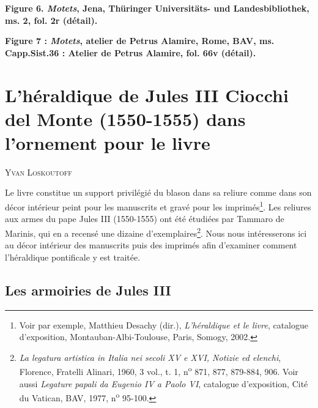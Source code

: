 \documentclass[12pt,twoside,openany]{book}
\newcommand{\PurhContributors}[1]{%
  \par\vspace{0.5\baselineskip}%
  {\normalsize\scshape #1\par}%
  \vspace{0.6\baselineskip}%
}
\begin{document}
\begin{center}
\par\small \textbf{Figure 6. \textit{Motets}, Jena, Thüringer Universitäts- und Landesbibliothek, ms. 2, fol. 2r (détail).}
\end{center}

\begin{center}
\par\small \textbf{Figure 7 : \textit{Motets}, atelier de Petrus Alamire, Rome, BAV, ms. Capp.Sist.36 : Atelier de Petrus Alamire, fol. 66v (détail).}
\end{center}

\chapter{L’héraldique de Jules III Ciocchi del Monte (1550-1555) dans l’ornement pour le livre}

\PurhContributors{Yvan Loskoutoff}

Le livre constitue un support privilégié du blason dans sa reliure comme dans son décor intérieur peint pour les manuscrits et gravé pour les imprimés\footnote{Voir par exemple, Matthieu Desachy (dir.), \textit{L’héraldique et le livre}, catalogue d’exposition, Montauban-Albi-Toulouse, Paris, Somogy, 2002.}. Les reliures aux armes du pape Jules III (1550-1555) ont été étudiées par Tammaro de Marinis, qui en a recensé une dizaine d’exemplaires\footnote{\textit{La legatura artistica in Italia nei secoli XV e XVI, Notizie ed elenchi}, Florence, Fratelli Alinari, 1960, 3 vol., t. 1, n\textsuperscript{o} 871, 877, 879-884, 906. Voir aussi \textit{Legature papali da Eugenio IV a Paolo VI}, catalogue d’exposition, Cité du Vatican, BAV, 1977, n\textsuperscript{o} 95-100.}. Nous nous intéresserons ici au décor intérieur des manuscrits puis des imprimés afin d’examiner comment l’héraldique pontificale y est traitée.

\section{Les armoiries de Jules III}
\end{document}
